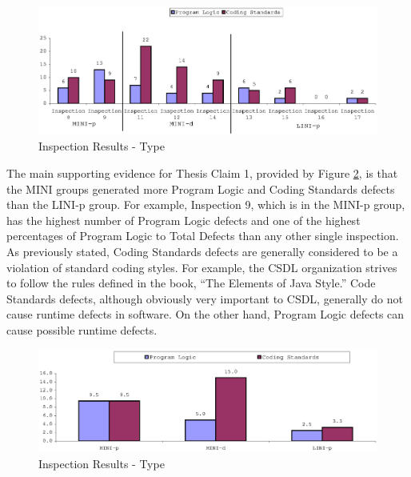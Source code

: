 \begin{figure}[!h]
  \centering
  \includegraphics[width=1.0\textwidth]{figs/Results/inspection-results-3.eps}
  \caption{Inspection Results - Type}
  \label{fig:inspection-results-3}
\end{figure}

The main supporting evidence for Thesis Claim 1, provided by Figure
\ref{fig:inspection-results-average-3}, is that the MINI groups generated
more Program Logic and Coding Standards defects than the LINI-p group. For
example, Inspection 9, which is in the MINI-p group, has the highest number
of Program Logic defects and one of the highest percentages of Program
Logic to Total Defects than any other single inspection. As previously
stated, Coding Standards defects are generally considered to be a violation
of standard coding styles. For example, the CSDL organization strives to
follow the rules defined in the book, ``The Elements of Java Style.'' Code
Standards defects, although obviously very important to CSDL, generally do
not cause runtime defects in software. On the other hand, Program Logic
defects can cause possible runtime defects.

\begin{figure}[!h]
  \centering
  \includegraphics[width=1.0\textwidth]{figs/Results/inspection-results-average-3.eps}
  \caption{Inspection Results - Type}
  \label{fig:inspection-results-average-3}
\end{figure}

